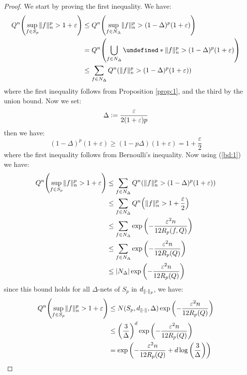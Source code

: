 \documentclass{article}
\theoremstyle{plain}
\theoremstyle{definition}
\theoremstyle{remark}
\newcommand{\defeq}{\vcentcolon=}
\let\brace\undefined
\DeclarePairedDelimiter{\brace}{\lbrace}{\rbrace}
\DeclarePairedDelimiter{\paren}{\lparen}{\rparen}
\newcommand{\eps}{\varepsilon}
\newcommand{\logp}[1]{\log{\left(#1\right)}}
\DeclarePairedDelimiter{\abs}{\lvert}{\rvert}
\DeclarePairedDelimiter{\norm}{\lVert}{\rVert}
\begin{document}
\begin{proof}
    We start by proving the first inequality. We have:
    \begin{align*}
        Q^{n}\paren*{\sup_{f \in S_p} \norm{f}_n^p > 1 + \eps} &\leq Q^{n}\paren*{\sup_{f \in N_{\Delta}} \norm{f}_n^p > (1 - \Delta)^{p}(1 + \eps)} \\
        &= Q^{n}\paren*{\bigcup_{f \in N_{\Delta}} \brace*{\norm{f}_n^p > (1 - \Delta)^{p}(1 + \eps)}} \\
        &\leq \sum_{f \in N_{\Delta}} Q^{n}\paren*{\norm{f}_n^p > (1 - \Delta)^{p}(1 + \eps)}
    \end{align*}
    where the first inequality follows from Proposition \ref{prop:1}, and the third by the union bound. Now we set: 
    \begin{equation*}
        \Delta \defeq \frac{\eps}{2(1 + \eps)p}
    \end{equation*}
    then we have:
    \begin{equation*}
        (1-\Delta)^p (1+\eps) \geq (1 - p\Delta) (1+\eps) = 1 + \frac{\eps}{2}
    \end{equation*}
    where the first inequality follows from Bernoulli's inequality. Now using (\ref{bd:1}) we have:
    \begin{align*}
        Q^{n}\paren*{\sup_{f \in S_p} \norm{f}_n^p > 1 + \eps} &\leq \sum_{f \in N_{\Delta}} Q^{n}\paren*{\norm{f}_n^p > (1 - \Delta)^{p}(1 + \eps)} \\
        &\leq \sum_{f \in N_{\Delta}} Q^{n}\paren*{\norm{f}_n^p > 1 + \frac{\eps}{2}} \\
        &\leq \sum_{f \in N_{\Delta}} \exp{\paren*{-\frac{\eps^2n}{12 R_p(f, Q)}}} \\
        &\leq \sum_{f \in N_{\Delta}} \exp{\paren*{-\frac{\eps^2n}{12 R_p(Q)}}} \\
        &\leq \abs{N_\Delta} \exp{\paren*{-\frac{\eps^2n}{12 R_p(Q)}}}
    \end{align*}
    since this bound holds for all $\Delta$-nets of $S_p$ in $d_{\norm{\cdot}_p}$, we have:
    \begin{align*}
        Q^{n}\paren*{\sup_{f \in S_p} \norm{f}_n^p > 1 + \eps} &\leq N(S_p, d_{\norm{\cdot}}, \Delta) \exp{\paren*{-\frac{\eps^2n}{12 R_p(Q)}}} \\
        &\leq \paren*{\frac{3}{\Delta}}^{d} \exp{\paren*{-\frac{\eps^2n}{12 R_p(Q)}}} \\
        &= \exp{\paren*{-\frac{\eps^2n}{12 R_p(Q)} + d \logp{\frac{3}{\Delta}}}} \\

\end{align*}
\end{proof}
\end{document}
